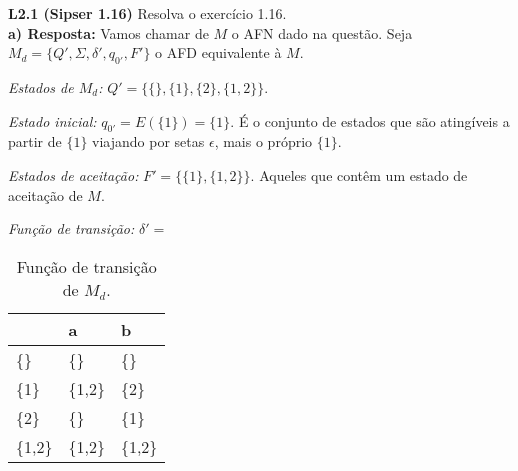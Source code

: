 
\noindent \textbf{L2.1 (Sipser 1.16)} Resolva o exercício 1.16.\\[3pt]
\noindent\textbf{a) Resposta:} Vamos chamar de $M$ o AFN dado na questão. Seja $M_d = \{Q', \Sigma, \delta', q_{0'}, F'\}$ o AFD equivalente à $M$.

\noindent\textit{Estados de $M_d$:} $Q' = \{\{\}, \{1\}, \{2\}, \{1,2\} \}$.

\noindent\textit{Estado inicial:} $q_{0'} = E(\{1\}) = \{1\}$. É o conjunto de estados que são atingíveis a partir de $\{1\}$ viajando por setas $\epsilon$, mais o próprio $\{1\}$.

\noindent\textit{Estados de aceitação:} $F' = \{\{1\}, \{1,2\}\}$. Aqueles que contêm um estado de aceitação de $M$.

\noindent\textit{Função de transição:} $\delta' = $
\begin{table}[!h]
\centering
{}
\begin{tabular}{l|l|l}
         & a         & b        \\ \hline
\{\}     & \{\}      & \{\}     \\
\{1\}    & \{1,2\}   & \{2\}    \\
\{2\}    & \{\}      & \{1\}    \\
\{1,2\}  & \{1,2\}   & \{1,2\}
\end{tabular}
\caption{Função de transição de $M_d$.}\vspace*{0.2cm}
\label{tbl:sip1.16a}
\end{table}

